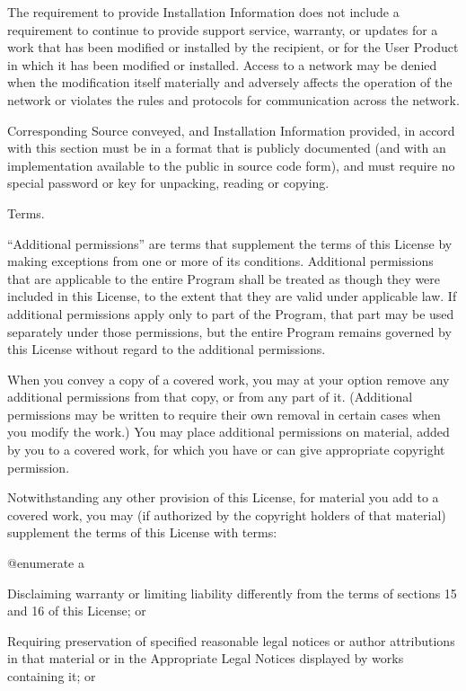 The requirement to provide Installation Information does not include a
requirement to continue to provide support service, warranty, or
updates for a work that has been modified or installed by the
recipient, or for the User Product in which it has been modified or
installed.  Access to a network may be denied when the modification
itself materially and adversely affects the operation of the network
or violates the rules and protocols for communication across the
network.

Corresponding Source conveyed, and Installation Information provided,
in accord with this section must be in a format that is publicly
documented (and with an implementation available to the public in
source code form), and must require no special password or key for
unpacking, reading or copying.

\itemAdditional Terms.

``Additional permissions'' are terms that supplement the terms of this
License by making exceptions from one or more of its conditions.
Additional permissions that are applicable to the entire Program shall
be treated as though they were included in this License, to the extent
that they are valid under applicable law.  If additional permissions
apply only to part of the Program, that part may be used separately
under those permissions, but the entire Program remains governed by
this License without regard to the additional permissions.

When you convey a copy of a covered work, you may at your option
remove any additional permissions from that copy, or from any part of
it.  (Additional permissions may be written to require their own
removal in certain cases when you modify the work.)  You may place
additional permissions on material, added by you to a covered work,
for which you have or can give appropriate copyright permission.

Notwithstanding any other provision of this License, for material you
add to a covered work, you may (if authorized by the copyright holders
of that material) supplement the terms of this License with terms:

@enumerate a
\item
Disclaiming warranty or limiting liability differently from the terms
of sections 15 and 16 of this License; or

\item
Requiring preservation of specified reasonable legal notices or author
attributions in that material or in the Appropriate Legal Notices
displayed by works containing it; or

